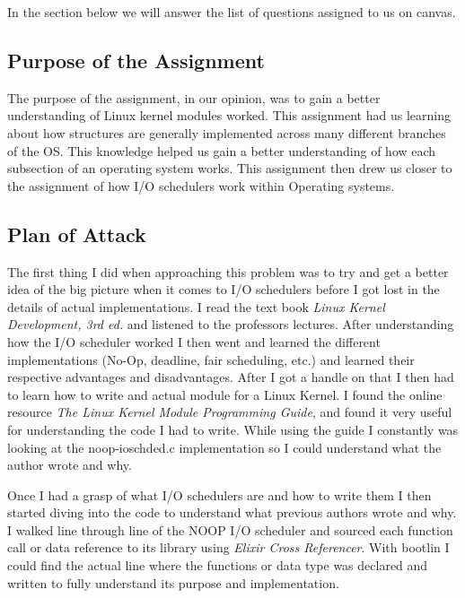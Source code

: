 \documentclass[onecolumn, draftclsnofoot,10pt, compsoc]{IEEEtran}
\begin{document}
            In the section below we will answer the list of questions assigned to us on canvas.

        \subsection{Purpose of the Assignment}
            The purpose of the assignment, in our opinion, was to gain a better understanding of Linux kernel modules worked. This assignment had us learning about how structures are generally implemented across many different branches of the OS. This knowledge helped us gain a better understanding of how each subsection of an operating system works. This assignment then drew us closer to the assignment of how I/O schedulers work within Operating systems.
            
        \subsection{Plan of Attack}
            The first thing I did when approaching this problem was to try and get a better idea of the big picture when it comes to I/O schedulers before I got lost in the details of actual implementations. I read the text book \textit{Linux Kernel Development, 3rd ed.}\cite{Linux-Kernel-Development:2} and listened to the professors lectures. After understanding how the I/O scheduler worked I then went and learned the different implementations (No-Op, deadline, fair scheduling, etc.) and learned their respective advantages and disadvantages. After I got a handle on that I then had to learn how to write and actual module for a Linux Kernel. I found the online resource \textit{The Linux Kernel Module Programming Guide}\cite{tldp-web:3}, and found it very useful for understanding the code I had to write. While using the guide I constantly was looking at the noop-ioschded.c implementation so I could understand what the author wrote and why.
            
            Once I had a grasp of what I/O schedulers are and how to write them I then started diving into the code to understand what previous authors wrote and why. I walked line through line of the NOOP I/O scheduler and sourced each function call or data reference to its library using \textit{Elixir Cross Referencer}\cite{bootlin:4}. With bootlin I could find the actual line where the functions or data type was declared and written to fully understand its purpose and implementation.
            
\end{document}
